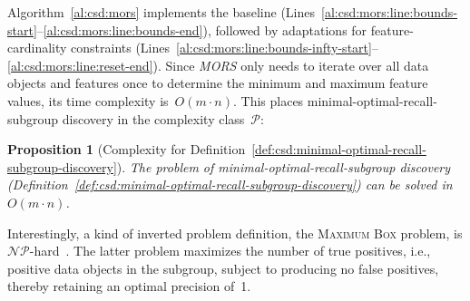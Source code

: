 \documentclass[acmsmall]{acmart} %
\theoremstyle{acmplain}
\newtheorem{proposition}{Proposition}
\theoremstyle{acmdefinition}
\begin{document}
Algorithm~\ref{al:csd:mors} implements the baseline (Lines~\ref{al:csd:mors:line:bounds-start}--\ref{al:csd:mors:line:bounds-end}), followed by adaptations for feature-cardinality constraints (Lines~\ref{al:csd:mors:line:bounds-infty-start}--\ref{al:csd:mors:line:reset-end}).
Since \emph{MORS} only needs to iterate over all data objects and features once to determine the minimum and maximum feature values, its time complexity is~$O(m \cdot n)$.
This places minimal-optimal-recall-subgroup discovery in the complexity class~$\mathcal{P}$:
%
\begin{proposition}[Complexity for Definition~\ref{def:csd:minimal-optimal-recall-subgroup-discovery}]
	The problem of minimal-optimal-recall-subgroup discovery (Definition~\ref{def:csd:minimal-optimal-recall-subgroup-discovery}) can be solved in~$O(m \cdot n)$.
	\label{prop:csd:complexity-unconstrained-minimal-optimal-recall-subgroup-discovery}
\end{proposition}
%
Interestingly, a kind of inverted problem definition, the \textsc{Maximum Box} problem, is $\mathcal{NP}$-hard~\cite{eckstein2002maximum}.
The latter problem maximizes the number of true positives, i.e., positive data objects in the subgroup, subject to producing no false positives, thereby retaining an optimal precision of~1.
\end{document}
